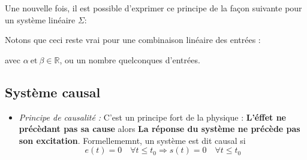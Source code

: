 \begin{itemize}
    Une nouvelle fois, il est possible d'exprimer ce principe de la façon 
    suivante pour un système linéaire $\Sigma$:
    \begin{center}
    \end{center}

    Notons que ceci reste vrai pour une combinaison linéaire des entrées :
    \begin{center}
    \end{center}
    avec $\alpha\ \text{et}\ \beta\in\mathbb{R}$, ou un nombre quelconques 
    d'entrées.
\end{itemize}

\subsection{Système causal}
\begin{itemize}
    \item \emph{Principe de causalité :}
        C'est un principe fort de la physique :
        \textbf{\og L'éffet ne précèdant pas sa cause\fg} alors 
        \textbf{\og La réponse du système ne précède pas son excitation\fg}.
        Formellememnt, un système est dit causal si 
        $$e(t)=0\quad\forall t\le t_0 \Rightarrow s(t)=0\quad\forall t\le t_0$$
\end{itemize}


